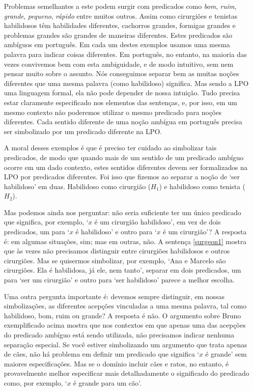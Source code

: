 Problemas semelhantes a este podem surgir com predicados como \emph{bom}, \emph{ruim}, \emph{grande}, \emph{pequeno}, \emph{rápido} entre muitos outros.
Assim como cirurgiões e tenistas habilidosos têm habilidades diferentes, cachorros grandes, formigas grandes e problemas grandes são grandes de maneiras diferentes.
Estes predicados são ambíguos em português.
Em cada um destes exemplos usamos uma mesma palavra para indicar coisas diferentes.
Em português, no entanto, na maioria das vezes convivemos bem com esta ambiguidade, e de modo intuitivo, sem nem pensar muito sobre o assunto.
Nós conseguimos separar bem as muitas noções diferentes que uma mesma palavra (como habilidoso) significa.
Mas sendo a LPO uma linguagem formal, ela não pode depender de nossa intuição.
Tudo precisa estar claramente especificado nos elementos das sentenças, e, por isso, em um mesmo contexto não poderemos utilizar o mesmo predicado para noções diferentes.
Cada sentido diferente de uma noção ambígua em português precisa ser simbolizado por um predicado diferente na LPO.

A moral desses exemplos é que é preciso ter cuidado ao simbolizar tais predicados, de modo que quando mais de um sentido de um predicado ambíguo ocorre em um dado contexto, estes sentidos diferentes devem ser formalizados na LPO por predicados diferentes.
Foi isso que fizemos ao separar a noção de `ser habilidoso' em duas. Habilidoso como cirurgião ($H_1$) e habilidoso como tenista ($H_2$). 

Mas podemos ainda nos perguntar: não seria suficiente ter um único predicado que significa, por exemplo, `$x$ é um cirurgião habilidoso', em vez de dois predicados, um para  `$x$ é habilidoso' e outro para  `$x$ é um cirurgião'?
A resposta é: em algumas situações, sim; mas em outras, não.
A sentença \ref{surgeon1} mostra que às vezes não precisamos distinguir entre cirurgiões habilidosos e outros cirurgiões.
Mas se quisermos simbolizar, por exemplo, `Ana e Marcelo são cirurgiões. Ela é habilidosa, já ele, nem tanto', separar em dois predicados, um para `ser um cirurgião' e outro para `ser habilidoso' parece a melhor escolha.

Uma outra pergunta importante é: devemos sempre distinguir, em nossas simbolizações, as diferentes  acepções vinculadas a uma mesma palavra, tal como habilidoso, bom, ruim ou grande?
A resposta é não. O argumento sobre Bruno exemplificado acima mostra que nos contextos em que apenas uma das acepções do predicado ambíguo está sendo utilizada, não precisamos indicar nenhuma separação especial.
Se você estiver simbolizando um argumento que trata apenas de cães, não há problema em definir um predicado que significa `$x$ é grande' sem maiores especificações.
Mas se o domínio incluir cães e ratos, no entanto, é provavelmente melhor especificar mais detalhadamente o significado do predicado como, por exemplo, `$x$ é grande para um cão'.


